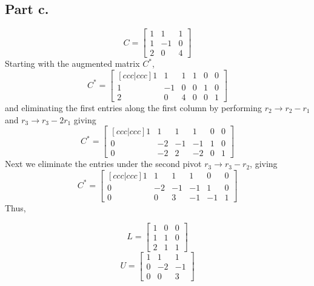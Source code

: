 \subsection{Part c.}
\begin{equation}
    C = 
    \begin{bmatrix}
        1   &   1   &   1   \\
        1   &   -1  &   0   \\
        2   &   0   &   4
    \end{bmatrix}
\end{equation}
Starting with the augmented matrix $C^{\ast}$,
\begin{equation}
    C^{\ast} =
    \begin{bmatrix}[ccc|ccc]
        1   &   1   &   1   &   1   &  0   &   0   \\
        1   &   -1  &   0   &   0   &  1   &   0   \\
        2   &   0   &   4   &   0   &  0   &   1
    \end{bmatrix}
\end{equation}
and eliminating the first entries along the first column by performing
$r_{2} \rightarrow r_{2} - r_{1}$ and $r_{3}\rightarrow r_{3} -2 r_{1}$
giving
\begin{equation}
    C^{\ast} =
    \begin{bmatrix}[ccc|ccc]
        1   &   1   &   1   &   1   &  0   &   0   \\
        0   &   -2  &   -1  &   -1  &  1   &   0   \\
        0   &   -2   &   2  &   -2  &  0   &   1
    \end{bmatrix}
\end{equation}
Next we eliminate the entries under the second pivot $r_{3} \rightarrow r_{3}
- r_{2}$, giving
\begin{equation}
    C^{\ast} =
    \begin{bmatrix}[ccc|ccc]
        1   &   1   &   1   &   1   &  0   &   0   \\
        0   &   -2  &   -1  &   -1  &  1   &   0   \\
        0   &   0   &   3   &   -1  &  -1  &   1
    \end{bmatrix}
\end{equation}
Thus, 
\begin{mdframed}[style=MyFrame]
    \begin{equation}
        L =
        \begin{bmatrix}
            1       &   0   &   0   \\
            1       &   1   &   0   \\
            2       &   1   &   1
        \end{bmatrix}
    \end{equation}
    \begin{equation}
        U =
        \begin{bmatrix}
            1       &   1   &   1   \\
            0       &   -2  &   -1  \\
            0       &   0   &   3
        \end{bmatrix}
    \end{equation}
\end{mdframed}
